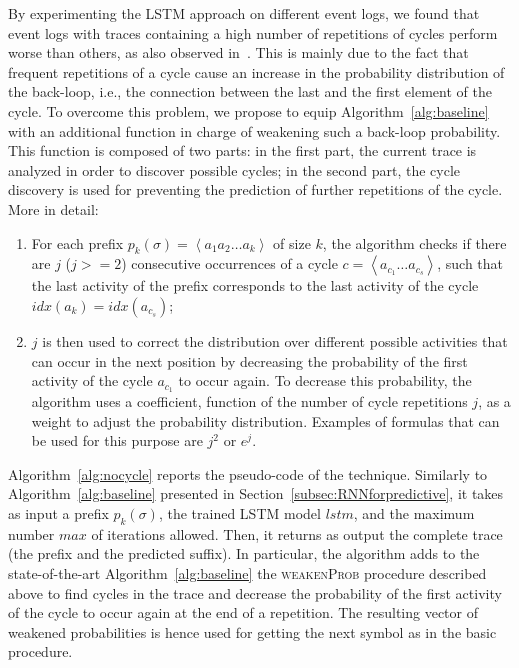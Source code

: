 By experimenting the LSTM approach on different event logs, we found that event logs with traces containing a high number of repetitions of cycles perform worse than others, as also observed in~\cite{niek96732}. This is mainly due to the fact that frequent repetitions of a cycle cause an increase in the probability distribution of the back-loop, i.e., the connection between the last and the first element of the cycle.
To overcome this problem, we propose to equip Algorithm~\ref{alg:baseline} with an additional function in charge of weakening such a back-loop probability. This function is composed of two parts: in the first part, the current trace is analyzed in order to discover possible cycles; in the second part, the cycle discovery is used for preventing the prediction of further repetitions of the cycle. %
More in detail:
\begin{enumerate}
\item For each prefix $p_k(\sigma)=\left\langle a_1a_2 \ldots a_k\right\rangle$ of size $k$, the algorithm checks if there are $j$ ($j>=2$) consecutive occurrences of a cycle $c=\left\langle a_{c_1}\ldots a_{c_s}\right\rangle$, such that the last activity of the prefix corresponds to the last activity of the cycle $idx(a_k)=idx(a_{c_s})$;
\item $j$ is then used to correct the distribution over different possible activities that can occur in the next position by decreasing the probability of the first activity of the cycle $a_{c_1}$ to occur again. To decrease this probability, the algorithm uses a coefficient, function of the number of cycle repetitions $j$, as a weight to adjust the probability distribution. Examples of formulas that can be used for this purpose are $j^{2}$ or $e^{j}$.
\end{enumerate}


Algorithm~\ref{alg:nocycle} reports the pseudo-code of the \nocycle technique. Similarly to Algorithm~\ref{alg:baseline} presented in Section~\ref{subsec:RNNforpredictive}, it takes as input a prefix $p_k(\sigma)$,  the trained LSTM model $lstm$, and the maximum number $max$ of iterations allowed. Then, it returns as output the complete trace (the prefix and the predicted suffix).  In particular, the algorithm adds to the state-of-the-art Algorithm~\ref{alg:baseline} the \textsc{weakenProb} procedure described above to find cycles in the trace and decrease the probability of the first activity of the cycle to occur again at the end of a repetition. The resulting vector of weakened probabilities is hence used for getting the next symbol as in the basic procedure.

